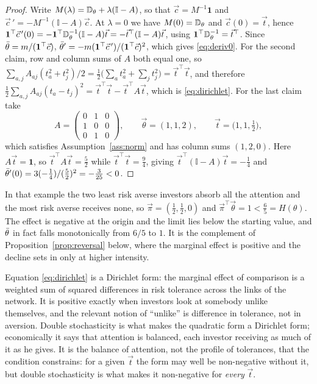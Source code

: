 \begin{proof}
Write $M(\lambda)=\mathbb{D}_{\theta}+\lambda(\mathbb{I}-A)$, so that
$\vec c=M^{-1}\mathbf 1$ and
$\vec c\,'=-M^{-1}(\mathbb{I}-A)\vec c$. At $\lambda=0$ we have
$M(0)=\mathbb{D}_{\theta}$ and $\vec c(0)=\vec t$, hence
$\mathbf 1^{\top}\vec c\,'(0)=-\mathbf 1^{\top}\mathbb{D}_{\theta}^{-1}(\mathbb{I}-A)\vec t
=-\vec t^{\top}(\mathbb{I}-A)\vec t$, using
$\mathbf 1^{\top}\mathbb{D}_{\theta}^{-1}=\vec t^{\top}$. Since
$\bar\theta=m/(\mathbf 1^{\top}\vec c)$,
$\bar\theta'=-m(\mathbf 1^{\top}\vec c\,')/(\mathbf 1^{\top}\vec c)^{2}$, which gives
\eqref{eq:deriv0}. For the second claim, row and column sums of $A$ both equal
one, so
$\sum_{a,j}A_{aj}(t_a^{2}+t_j^{2})/2
=\tfrac12\big(\sum_at_a^{2}+\sum_jt_j^{2}\big)=\vec t^{\top}\vec t$, and
therefore
$\tfrac12\sum_{a,j}A_{aj}(t_a-t_j)^{2}
=\vec t^{\top}\vec t-\vec t^{\top}A\vec t$, which is \eqref{eq:dirichlet}. For
the last claim take
%
\begin{equation*}
A=\begin{pmatrix}0&1&0\\1&0&0\\0&1&0\end{pmatrix},
\qquad
\vec\theta=(1,1,2),
\qquad
\vec t=\big(1,1,\tfrac12\big),
\end{equation*}
%
which satisfies Assumption~\ref{ass:norm} and has column sums $(1,2,0)$. Here
$A\vec t=\mathbf 1$, so $\vec t^{\top}A\vec t=\tfrac52$ while
$\vec t^{\top}\vec t=\tfrac94$, giving
$\vec t^{\top}(\mathbb{I}-A)\vec t=-\tfrac14$ and
$\bar\theta'(0)=3(-\tfrac14)/(\tfrac52)^{2}=-\tfrac{3}{25}<0$.
\end{proof}

In that example the two least risk averse investors absorb all the attention and
the most risk averse receives none, so $\vec\pi=(\tfrac12,\tfrac12,0)$ and
$\vec\pi^{\top}\vec\theta=1<\tfrac65=H(\theta)$. The effect is negative at the
origin and the limit lies below the starting value, and $\bar\theta$ in fact falls
monotonically from $6/5$ to $1$. It is the complement of
Proposition~\ref{prop:reversal} below, where the marginal effect is positive and
the decline sets in only at higher intensity.

Equation \eqref{eq:dirichlet} is a Dirichlet form: the marginal effect of
comparison is a weighted sum of squared differences in risk tolerance across
the links of the network. It is positive exactly when investors look at
somebody unlike themselves, and the relevant notion of ``unlike'' is difference
in tolerance, not in aversion. Double stochasticity is what makes the quadratic
form a Dirichlet form; economically it says that attention is balanced, each
investor receiving as much of it as he gives. It is the balance of attention,
not the profile of tolerances, that the condition constrains: for a given
$\vec t$ the form may well be non-negative without it, but double stochasticity
is what makes it non-negative for \emph{every} $\vec t$.


